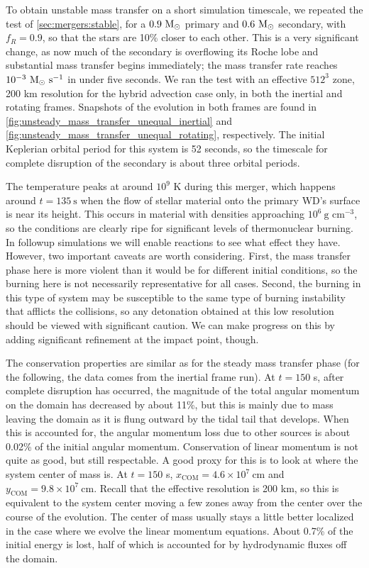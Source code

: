 \documentclass[12pt]{article}
\begin{document}
To obtain unstable mass transfer on a short simulation timescale, we repeated the test of
\autoref{sec:mergers:stable}, for a $0.9\ \mathrm{M}_\odot$ primary and $0.6\ \mathrm{M}_\odot$ secondary, with
$f_R = 0.9$, so that the stars are 10\% closer to each other. This
is a very significant change, as now much of the secondary is overflowing its Roche lobe and
substantial mass transfer begins immediately; the mass transfer rate reaches
$10^{-3}\ \msolar\ \text{s}^{-1}$ in under five seconds. We ran the test with an effective
$512^3$ zone, 200 km resolution for the hybrid advection case only, in both the inertial and
rotating frames. Snapshots of the evolution in both frames are found in
\autoref{fig:unsteady_mass_transfer_unequal_inertial} and
\autoref{fig:unsteady_mass_transfer_unequal_rotating}, respectively. The initial
Keplerian orbital period for this system is 52 seconds, so the timescale for
complete disruption of the secondary is about three orbital periods.

The temperature peaks at around $10^9$ K during this merger, which happens around $t = 135\ \text{s}$
when the flow of stellar material onto the primary WD's surface is near its height. This occurs
in material with densities approaching $10^6\ \text{g cm}^{-3}$, so the conditions are clearly ripe
for significant levels of thermonuclear burning. In followup simulations we will enable reactions
to see what effect they have. However, two important caveats are worth considering. First, the mass
transfer phase here is more violent than it would be for different initial conditions, so the
burning here is not necessarily representative for all cases. Second, the burning in this type of system
may be susceptible to the same type of burning instability that afflicts the collisions, so any detonation
obtained at this low resolution should be viewed with significant caution. We can make progress on this
by adding significant refinement at the impact point, though.

The conservation properties are similar as for the steady mass transfer phase (for the following, the
data comes from the inertial frame run). At $t = 150$ s, after complete disruption has occurred, the
magnitude of the total angular momentum on the domain has decreased by about 11\%, but this is mainly
due to mass leaving the domain as it is flung outward by the tidal tail that develops. When this is
accounted for, the angular momentum loss due to other sources is about 0.02\% of the initial angular
momentum. Conservation of linear momentum is not quite as good, but still respectable.
A good proxy for this is to look at where the system center of mass is. At $t = 150$ s,
$x_{\text{COM}} = 4.6 \times 10^7\ \text{cm}$ and $y_{\text{COM}} = 9.8 \times 10^7\ \text{cm}$. Recall that
the effective resolution is 200 km, so this is equivalent to the system center moving a few zones away
from the center over the course of the evolution. The center of mass usually stays a little better
localized in the case where we evolve the linear momentum equations. About 0.7\% of the initial energy
is lost, half of which is accounted for by hydrodynamic fluxes off the domain.
\end{document}
